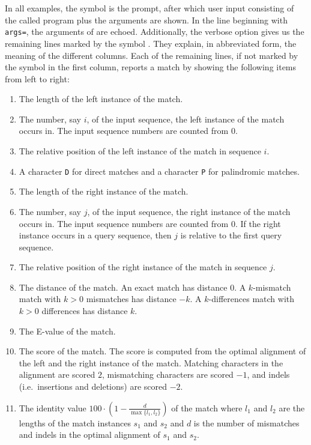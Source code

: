 \documentclass[12pt,titlepage]{article}
\makeatletter
\newcommand{\TTindex}[1]{\index{#1@\texttt{#1}}}
\newcommand{\ArabicLabels}{
  \renewcommand{\labelenumi}{$(\arabic{enumi})$}
  \renewcommand{\theenumi}{(\arabic{enumi})}
}
\makeatother
\begin{document}
\begin{AboutVmatch}
In all examples, the symbol \texttt{} is the prompt, after which user
input consisting of the called program plus the arguments are shown. In the 
line beginning with \texttt{ args=}, the arguments of \VM are echoed. 
Additionally, the verbose option gives us the remaining lines marked by the
symbol \texttt{}. They explain, in abbreviated form, the meaning
of the different columns.
Each of the remaining lines, if not marked by the symbol
\texttt{} in the first column, reports a match by 
showing the following items from left to right:
\begin{enumerate}
\ArabicLabels
\item
{}
The length of the left instance of the match.
\item
The number, say \(i\), of the input sequence, the left instance of the match 
occurs in. The input sequence numbers are counted from 0.
\item
The relative position of the left instance of the match in sequence \(i\).
\item
A character \texttt{D} for 
\TTindex{D} direct matches and a character \texttt{P} for
\TTindex{P} 
palindromic matches.
\item
The length of the right instance of the match.
\item
The number, say \(j\), of the input sequence, the right instance of the match 
occurs in. The input sequence numbers are counted from 0. 
If the right instance
occurs in a query sequence, then \(j\) is relative to the first query 
sequence.
\item
The relative position of the right instance of the match in sequence \(j\).
\item
The distance of the match. 
An exact match has distance 0.
A \(k\)-mismatch match with \(k>0\) mismatches has distance \(-k\).
A \(k\)-differences match with \(k>0\) differences has distance \(k\).
\item
The E-value of the match.
\item
The score of the match. The score is computed from the
optimal alignment of the left and the right instance of
the match. Matching characters in the alignment are scored \(2\), 
mismatching characters are scored \(-1\), and indels (i.e.\ insertions
and deletions) are scored \(-2\).
\item
{}
The identity value \(100 \cdot(1-\frac{d}{\max\{l_{1},l_{2}\}})\) of the match
where \(l_{1}\) and \(l_{2}\) are the lengths of the match instances
\(s_{1}\) and \(s_{2}\) and \(d\) is the number of 
mismatches and indels in the optimal alignment of 
\(s_{1}\) and \(s_{2}\).
\end{enumerate}


\end{AboutVmatch}
\end{document}
